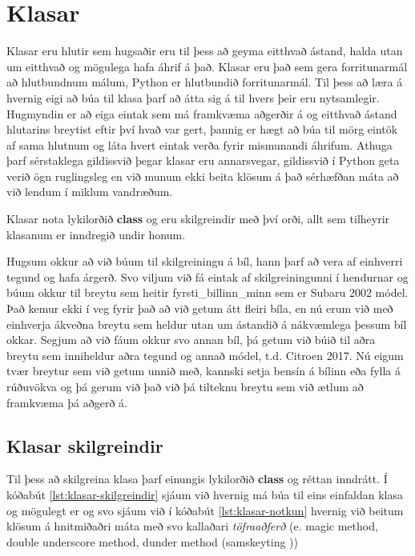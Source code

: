 
\chapter{Klasar}\label{k:klasar}
Klasar eru hlutir sem hugsaðir eru til þess að geyma eitthvað ástand, halda utan um eitthvað og mögulega hafa áhrif á það.
Klasar eru það sem gera forritunarmál að hlutbundnum málum, Python er hlutbundið forritunarmál.
Til þess að læra á hvernig eigi að búa til klasa þarf að átta sig á til hvers þeir eru nytsamlegir.
Hugmyndin er að eiga eintak sem má framkvæma aðgerðir á og eitthvað ástand hlutarins breytist eftir því hvað var gert, þannig er hægt að búa til mörg eintök af sama hlutnum og láta hvert eintak verða fyrir mismunandi áhrifum.
Athuga þarf sérstaklega gildissvið þegar klasar eru annarsvegar, gildissvið í Python geta verið ögn ruglingsleg en við munum ekki beita klösum á það sérhæfðan máta að við lendum í miklum vandræðum.

Klasar nota lykilorðið \textbf{class} og eru skilgreindir með því orði, allt sem tilheyrir klasanum er inndregið undir honum.

Hugsum okkur að við búum til skilgreiningu á bíl, hann þarf að vera af einhverri tegund og hafa árgerð.
Svo viljum við fá eintak af skilgreiningunni í hendurnar og búum okkur til breytu sem heitir fyrsti\_billinn\_minn sem er Subaru 2002 módel.
Það kemur ekki í veg fyrir það að við getum átt fleiri bíla, en nú erum við með einhverja ákveðna breytu sem heldur utan um ástandið á nákvæmlega þessum bíl okkar.
Segjum að við fáum okkur svo annan bíl, þá getum við búið til aðra breytu sem inniheldur aðra tegund og annað módel, t.d. Citroen 2017.
Nú eigum tvær breytur sem við getum unnið með, kannski setja bensín á bílinn eða fylla á rúðuvökva og þá gerum við það við þá tilteknu breytu sem við ætlum að framkvæma þá aðgerð á.

\section{Klasar skilgreindir}\label{uk:klasar-skilgreindir}
Til þess að skilgreina klasa þarf einungis lykilorðið \textbf{class} og réttan inndrátt.
Í kóðabút \ref{lst:klasar-skilgreindir} sjáum við hvernig má búa til eins einfaldan klasa og mögulegt er og svo sjáum við í kóðabút \ref{lst:klasar-notkun} hvernig við beitum klösum á hnitmiðaðri máta með svo kallaðari \textit{töfraaðferð} (e. magic method, double underscore method, dunder method (samskeyting ))

